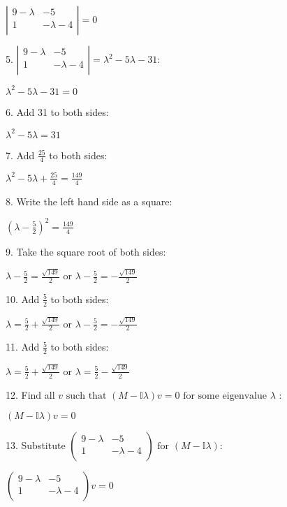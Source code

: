 \documentclass{article}
\begin{document}
$\left| 
\begin{array}{cc}
9-\lambda  & -5 \\
 1 & -\lambda -4 \\
\end{array}
\right| =0$

5. $\left| 
\begin{array}{cc}
9-\lambda  & -5 \\
 1 & -\lambda -4 \\
\end{array}
\right| =\lambda ^2-5 \lambda -31:$

$\lambda ^2-5 \lambda -31=0$

6. Add 31 to both sides:

$\lambda ^2-5 \lambda =31$

7. Add $\frac{25}{4}$ to both sides:

$\lambda ^2-5 \lambda +\frac{25}{4}=\frac{149}{4}$

8. Write the left hand side as a square:

$\left(\lambda -\frac{5}{2}\right)^2=\frac{149}{4}$

9. Take the square root of both sides:

$\lambda -\frac{5}{2}=\frac{\sqrt{149}}{2}\text{ or }\lambda -\frac{5}{2}=-\frac{\sqrt{149}}{2}$

10. Add $\frac{5}{2}$ to both sides:

$\lambda =\frac{5}{2}+\frac{\sqrt{149}}{2}\text{ or }\lambda -\frac{5}{2}=-\frac{\sqrt{149}}{2}$

11. Add $\frac{5}{2}$ to both sides:

$\lambda =\frac{5}{2}+\frac{\sqrt{149}}{2}\text{ or }\lambda =\frac{5}{2}-\frac{\sqrt{149}}{2}$

12. Find all $v\text{ such that }(M-\mathbb{I} \lambda ) v=0\text{ for some eigenvalue }\lambda$ :

$(M-\mathbb{I} \lambda ) v=0$

13. Substitute $\left(
\begin{array}{cc}
9-\lambda  & -5 \\
 1 & -\lambda -4 \\
\end{array}
\right)\text{ for }(M-\mathbb{I} \lambda ):$

$\left(
\begin{array}{cc}
9-\lambda  & -5 \\
 1 & -\lambda -4 \\
\end{array}
\right) v=0$
\end{document}
